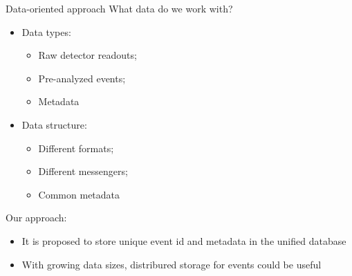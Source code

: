 \documentclass[18pt]{beamer}
\begin{document}
\begin{frame}{Data-oriented approach}
What data do we work with?


\parbox{0.48\textwidth}{
\begin{itemize}
  \item Data types:
  \begin{itemize}
    \item Raw detector readouts;
    \item Pre-analyzed events;
    \item Metadata
  \end{itemize}
\end{itemize}
}
\hfill
\parbox{0.48\textwidth}{
\begin{itemize}
  \item Data structure:
  \begin{itemize}
    \item Different formats;
    \item Different messengers;
    \item Common metadata
  \end{itemize}
\end{itemize}
}

Our approach:
\begin{itemize}
 \item It is proposed to store unique event id and metadata in the unified database
 \item With growing data sizes, distribured storage for events could be useful
\end{itemize}
\end{frame}

\end{document}
